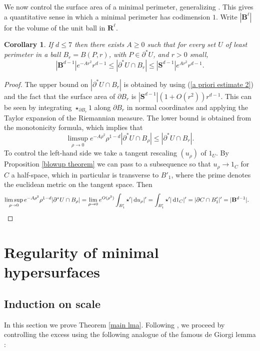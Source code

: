 \documentclass[reqno,10pt]{amsart}
\newcommand{\RR}{\mathbf{R}}
\newcommand{\Sph}{\mathbf S}
\newcommand{\Ball}{\mathbf{B}}
\newcommand*\dif{\mathop{}\!\mathrm{d}}
\newtheorem{corollary}[theorem]{Corollary}
\theoremstyle{definition}
\numberwithin{equation}{section}
\begin{document}
We now control the surface area of a minimal perimeter, generalizing \cite[Remark 5.13]{Giusti77}.
This gives a quantitative sense in which a minimal perimeter has codimension $1$.
Write $|\Ball^\ell|$ for the volume of the unit ball in $\RR^\ell$.

\begin{corollary}\label{doubling dimension}
If $d \leq 7$ then there exists $A \geq 0$ such that for every set $U$ of least perimeter in a ball $B_r = B(P, r)$, with $P \in \partial^* U$, and $r > 0$ small,
$$|\Ball^{d - 1}|e^{-Ar^2}r^{d - 1} \leq |\partial^*U \cap B_r| \leq |\Sph^{d - 1}|e^{Ar^2} r^{d - 1}.$$
\end{corollary}
\begin{proof}
The upper bound on $|\partial^* U \cap B_r|$ is obtained by using (\ref{a priori estimate 2}) and the fact that the surface area of $\partial B_r$ is $|\Sph^{d - 1}|(1 + O(r^2))r^{d - 1}$.
This can be seen by integrating $\star_{\partial B_r} 1$ along $\partial B_r$ in normal coordinates and applying the Taylor expansion of the Riemannian measure.
The lower bound is obtained from the monotonicity formula, which implies that
$$\limsup_{\rho \to 0} e^{-A\rho^2} \rho^{1 - d} |\partial^* U \cap B_\rho| \leq |\partial^* U \cap B_r|.$$
To control the left-hand side we take a tangent rescaling $(u_\rho)$ of $1_U$.
By Proposition \ref{blowup theorem} we can pass to a subsequence so that $u_\rho \to 1_C$ for $C$ a half-space, which in particular is transverse to $B'_1$, where the prime denotes the euclidean metric on the tangent space.
Then
\begin{align*}
\limsup_{\rho \to 0} e^{-A\rho^2} \rho^{1 - d} |\partial^* U \cap B_\rho| &= \lim_{\rho \to 0} e^{O(\rho^2)} \int_{B'_1} \star'|\dif u_\rho|' = \int_{B'_1} \star'|\dif 1_C|' = |\partial C \cap B'_1|' = |\Ball^{d - 1}|. \qedhere
\end{align*}
\end{proof}







\section{Regularity of minimal hypersurfaces}\label{Plateau section}
\subsection{Induction on scale}
In this section we prove Theorem \ref{main lma}.
Following \cite{Miranda66,Giusti77,deGiorgi61}, we proceed by controlling the excess using the following analogue of the famous de Giorgi lemma \cite[Theorem 8.1]{Giusti77}:
\end{document}
